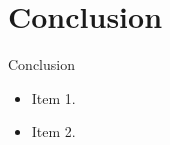 \section{Conclusion}


\begin{frame}{Conclusion}
  \begin{itemize}
    \item Item 1.
    \item Item 2.
  \end{itemize}
\end{frame}


